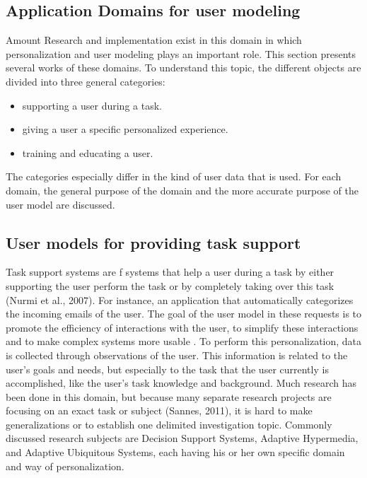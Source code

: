\subsection{Application Domains for user modeling}

Amount Research and implementation exist in this domain in which personalization
and user modeling plays an important role. This section presents several works
of these domains. To understand this topic, the different objects are divided
into three general categories:
\begin{itemize}
\item {supporting a user during a task. }
\item {giving a user a specific personalized experience. }
\item {training and educating a user.}
\end{itemize} 
The categories especially differ in the kind of user data that is used. For each
domain, the general purpose of the domain and the more accurate purpose of the
user model are discussed.

\subsection{User models for providing task support}

Task support systems are f systems that help a user during a task by either
supporting the user perform the task or by completely taking over this task
\cite{brun2010compass}(Nurmi et al., 2007). For instance,  an application that
automatically categorizes the incoming emails of the user. The goal of the user
model in these requests is to promote the efficiency of interactions with the
user, to simplify these interactions and to make complex systems more usable
\cite{razmerita2009user}\cite{fischer2001user}.
To perform this personalization, data is
collected through observations of the user. This information is related to the
user’s goals and needs, but especially to the task that the user currently is
accomplished, like the user’s task knowledge and background. Much research has
been done in this domain, but because many separate research projects are
focusing on an exact task or subject \cite{}(Sannes, 2011), it is hard to make
generalizations or to establish one delimited investigation topic. Commonly
discussed research subjects are Decision Support Systems,  Adaptive Hypermedia,
and Adaptive Ubiquitous Systems, each having his or her own specific domain and
way of personalization.  

